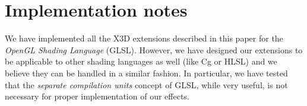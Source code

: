 \documentclass{egpubl}
\begin{document}


\section{Implementation notes}

We have implemented all the X3D extensions described in this paper
for the \emph{OpenGL Shading Language} (GLSL).
However, we have designed our extensions
to be applicable to other shading languages as well (like Cg or HLSL)
and we believe they can be handled in a similar fashion.
In particular, we have tested that the \emph{separate compilation units}
concept of GLSL, while very useful, is not necessary for proper implementation
of our effects.


\end{document}
